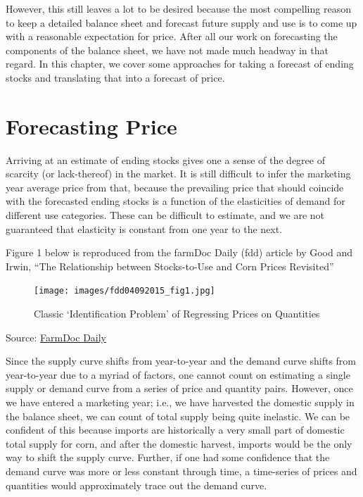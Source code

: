 \documentclass[
  letterpaper,
  DIV=11,
  numbers=noendperiod]{scrreprt}
\begin{document}
However, this still leaves a lot to be desired because the most
compelling reason to keep a detailed balance sheet and forecast future
supply and use is to come up with a reasonable expectation for price.
After all our work on forecasting the components of the balance sheet,
we have not made much headway in that regard. In this chapter, we cover
some approaches for taking a forecast of ending stocks and translating
that into a forecast of price.

\hypertarget{forecasting-price}{%
\section{Forecasting Price}\label{forecasting-price}}

Arriving at an estimate of ending stocks gives one a sense of the degree
of scarcity (or lack-thereof) in the market. It is still difficult to
infer the marketing year average price from that, because the prevailing
price that should coincide with the forecasted ending stocks is a
function of the elasticities of demand for different use categories.
These can be difficult to estimate, and we are not guaranteed that
elasticity is constant from one year to the next.

Figure 1 below is reproduced from the farmDoc Daily (fdd) article by
Good and Irwin, ``The Relationship between Stocks-to-Use and Corn Prices
Revisited''

\begin{figure}

{\centering \texttt{[image: images/fdd04092015\_fig1.jpg]}

}

\caption{Classic `Identification Problem' of Regressing Prices on
Quantities}

\end{figure}

Source:
\href{http://farmdocdaily.illinois.edu/2015/04/relationship-stock-to-use-and-corn-prices.html}{FarmDoc
Daily}

Since the supply curve shifts from year-to-year and the demand curve
shifts from year-to-year due to a myriad of factors, one cannot count on
estimating a single supply or demand curve from a series of price and
quantity pairs. However, once we have entered a marketing year; i.e., we
have harvested the domestic supply in the balance sheet, we can count of
total supply being quite inelastic. We can be confident of this because
imports are historically a very small part of domestic total supply for
corn, and after the domestic harvest, imports would be the only way to
shift the supply curve. Further, if one had some confidence that the
demand curve was more or less constant through time, a time-series of
prices and quantities would approximately trace out the demand curve.
\end{document}
